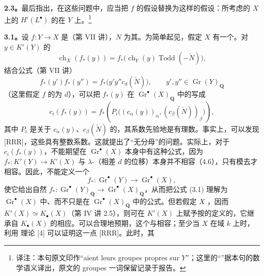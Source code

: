 \textbf{2.3。}最后指出，在这些问题中，应当把 $f$ 的假设替换为这样的假设：所考虑的 $X$ 上的 $H^i(L^\bullet)$ 的在 $Y$ 上。\footnote{译注：本句原文印作“aient leurs groupes propres sur $Y$”；这里的“”据本句的数学语义译出，原文的 groupes 一词保留记录于报告。}

\textbf{3.1。}设 $f:Y\to X$ 是（第 VII 讲），$N$ 为其。为简单起见，假定 $X$ 有一个。对 $y\in K'(Y)$ 的 
\[\operatorname{ch}_X(f_*(y))
=f_*\bigl(\operatorname{ch}_Y(y)\operatorname{Todd}(-\check N)\bigr),\]
结合公式（第 VII 讲）
\[f_*(y')f_*(y'')=f_*\bigl(y'y''c_d(\check N)\bigr),
\qquad y',y''\in\operatorname{Gr}(Y)_{\mathbf Q}\]
（这里假定 $f$ 的为 $d$），可以把 $f_*(y)$ 在 $\operatorname{Gr}^\bullet(X)_{\mathbf Q}$ 中的写成
\[c_i(f_*(y))
=f_*\left(P_i\bigl((c_\alpha(y))_\alpha,(c_\beta(\check N))_\beta\bigr)\right),\tag{3.1}\]
其中 $P_i$ 是关于 $c_\alpha(y)$、$c_\beta(\check N)$ 的，其系数先验地是有理数。事实上，可以发现 [RRR]，这些具有整数系数。这就提出了“无分母”的问题。实际上，对于 $c_i(f_*(y))$，不能期望在 $\operatorname{Gr}^\bullet(X)$ 本身中有这种公式，因为 $f_*:K'(Y)\to K'(X)$ 与 $\lambda$-（相差 $d$ 的位移）本身并不相容（4.6），只有模去才相容。因此，不能定义一个
\[f_*:\operatorname{Gr}^\bullet(Y)\longrightarrow\operatorname{Gr}^\bullet(X),\]
使它给出自然 $f_*:\operatorname{Gr}^\bullet(Y)_{\mathbf Q}\to\operatorname{Gr}^\bullet(X)_{\mathbf Q}$，从而把公式 (3.1) 理解为 $\operatorname{Gr}^\bullet(X)$ 中、而不只是在 $\operatorname{Gr}^\bullet(X)_{\mathbf Q}$ 中的公式。但若假定 $X$ ，因而 $K'(X)\simeq K_\bullet(X)$（第 IV 讲 2.5），则可在 $K'(X)$ 上赋予按的定义的，它继承自 $K_\bullet(X)$ 的相应。可以合理地预期，这个与相容；至少当 $X$ 在域 $k$ 上时，利用 理论 [4] 可以证明这一点 [RRR]。此时，其
